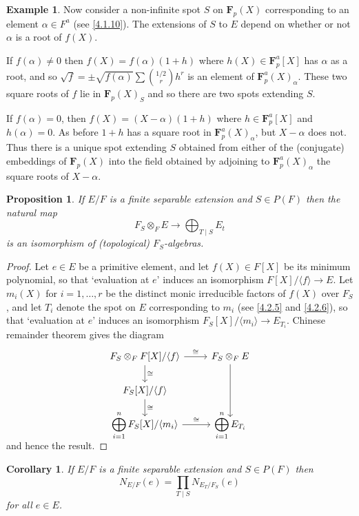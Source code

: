 \documentclass[10pt,leqno]{article}
\newtheorem{prop}[theo]{Proposition}
\newtheorem{coro}[theo]{Corollary}
\theoremstyle{definition}
\newtheorem{exam}[theo]{Example}
\def\<{\langle}
\def\>{\rangle}
\def\FF{\mathbf{F}}
\def\qw#1{`#1'}
\begin{document}
\begin{exam}
Now consider a non-infinite spot $S$ on $\FF_p(X)$ corresponding to an element $\alpha \in F^a$ (see \ref{4.1.10}).
The extensions of $S$ to $E$ depend on whether or not $\alpha$ is a root of $f(X)$.

If $f(\alpha) \not= 0$ then $f(X) = f(\alpha)(1+h)$ where $h(X) \in \FF_p^a[X]$ has $\alpha$ as a root, and so $\sqrt f = \pm \sqrt{f(\alpha)} \sum \binom{1/2}{r} h^r$ is an element of $\FF_p^a(X)_\alpha$.
These two square roots of $f$ lie in $\FF_p(X)_S$ and so there are two spots extending $S$.

If $f(\alpha) = 0$, then $f(X) = (X-\alpha)(1+h)$ where $h \in \FF_p^a[X]$ and $h(\alpha) = 0$.
As before $1+h$ has a square root in $\FF_p^a(X)_\alpha$, but $X-\alpha$ does not.
Thus there is a unique spot extending $S$ obtained from either of the (conjugate) embeddings of $\FF_p(X)$ into the field obtained by adjoining to $\FF_p^a(X)_\alpha$ the square roots of $X-\alpha$.
\end{exam}


\begin{prop}
\label{4.2.9}
If $E/F$ is a finite separable extension and $S \in P(F)$ then the natural map
\[
F_S \otimes_F E \to \bigoplus_{T \mid S} E_t
\]
is an isomorphism of (topological) $F_S$-algebras.
\end{prop}

\begin{proof}
Let $e \in E$ be a primitive element, and let $f(X) \in F[X]$ be its minimum polynomial, so that \qw{evaluation at $e$} induces an isomorphism $F[X] / \<f\> \to E$.
Let $m_i(X)$ for $i=1,\ldots,r$ be the distinct monic irreducible factors of $f(X)$ over $F_S$, and let $T_i$ denote the spot on $E$ corresponding to $m_i$ (see \ref{4.2.5} and \ref{4.2.6}), so that \qw{evaluation at $e$} induces an isomorphism $F_S[X]/\< m_i \> \to E_{T_i}$.
Chinese remainder theorem gives the diagram
\[
\begin{tikzcd}
F_S \otimes_F F[X]/\<f\> \ar[r,"\cong"] \ar[d,"\cong"] &
F_S \otimes_F E \ar[dd] 
\\
F_S[X] / \<f\> \ar[d,"\cong"] &
\\
\smash{\displaystyle\bigoplus_{i=1}^n F_S[X]} / \<m_i\> \ar[r, "\cong"] &
\smash{\displaystyle\bigoplus_{i=1}^n} \, E_{T_i}
\end{tikzcd}
\]
and hence the result.
\end{proof}


\begin{coro}
\label{4.2.10}
If $E/F$ is a finite separable extension and $S \in P(F)$ then
\[
N_{E/F}(e)
= \prod_{T \mid S} N_{E_T/F_S}(e)
\]
for all $e \in E$.
\end{coro}
\end{document}
